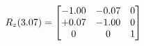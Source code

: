 \documentclass[preview]{standalone}
\begin{document}
\begin{align*}
\special{dvisvgm:raw <g id='unique000'>}R_{z}(3.07) = \begin{bmatrix}-1.00 & -0.07 & 0 \\+0.07 & -1.00 & 0 \\0 & 0 & 1\end{bmatrix}\special{dvisvgm:raw </g>}
\end{align*}
\end{document}
